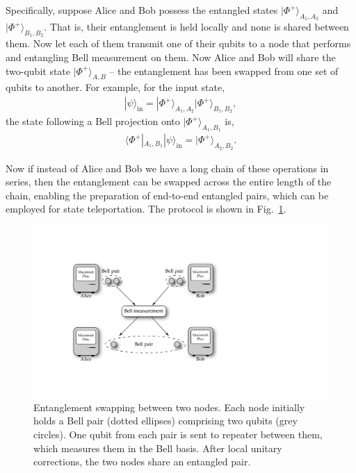 \documentclass[aps,rmp,twocolumn,amsmath,amssymb,nofootinbib,superscriptaddress,longbibliography,floatfix]{revtex4-1}
\newcommand{\bra}[1]{\langle#1|}
\newcommand{\ket}[1]{|#1\rangle}
\begin{document}
Specifically, suppose Alice and Bob possess the entangled states $\ket{\Phi^+}_{A_1,A_2}$ and $\ket{\Phi^+}_{B_1,B_2}$. That is, their entanglement is held locally and none is shared between them. Now let each of them transmit one of their qubits to a node that performs and entangling Bell measurement on them. Now Alice and Bob will share the two-qubit state $\ket{\Phi^+}_{A,B}$ -- the entanglement has been swapped from one set of qubits to another. For example, for the input state,
\begin{align}
\ket\psi_\mathrm{in} = \ket{\Phi^+}_{A_1,A_2} \ket{\Phi^+}_{B_1,B_2},
\end{align}
the state following a Bell projection onto $\ket{\Phi^+}_{A_1,B_1}$ is,
\begin{align}
\bra{\Phi^+}_{A_1,B_1} \ket\psi_\mathrm{in} = \ket{\Phi^+}_{A_2,B_2}.
\end{align}

Now if instead of Alice and Bob we have a long chain of these operations in series, then the entanglement can be swapped across the entire length of the chain, enabling the preparation of end-to-end entangled pairs, which can be employed for state teleportation. The protocol is shown in Fig.~\ref{fig:ent_swap}.

\begin{figure}[!htb]
\includegraphics[width=\columnwidth]{ent_swap}
\caption{Entanglement swapping between two nodes. Each node initially holds a Bell pair (dotted ellipses) comprising two qubits (grey circles). One qubit from each pair is sent to repeater between them, which measures them in the Bell basis. After local unitary corrections, the two nodes share an entangled pair.} \label{fig:ent_swap}
\end{figure}
\end{document}
